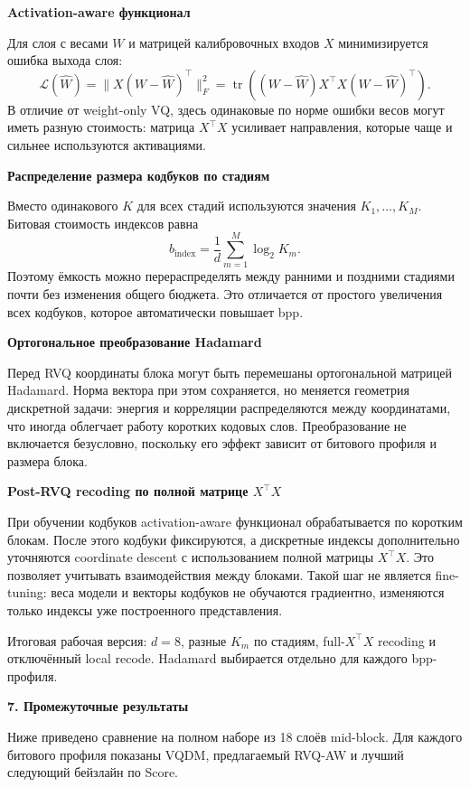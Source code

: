 \documentclass[11pt,a4paper]{article}
\newcommand{\sectiontitle}[1]{%
  \vspace{0.18cm}
  {\large\bfseries\color{msublue} #1}\par\vspace{0.08cm}
}
\newcommand{\subsectiontitle}[1]{%
  \vspace{0.10cm}
  {\normalsize\bfseries\color{msured} #1}\par\vspace{0.04cm}
}
\newcommand{\note}[1]{%
  \begingroup
  \setlength{\fboxsep}{6pt}
  \noindent\colorbox{softblue}{\parbox{\dimexpr\textwidth-2\fboxsep\relax}{#1}}
  \endgroup
}
\begin{document}
\subsectiontitle{Activation-aware функционал}

Для слоя с весами $W$ и матрицей калибровочных входов $X$ минимизируется ошибка выхода слоя:
\[
  \mathcal L(\hat W)=\|X(W-\hat W)^\top\|_F^2
  =\operatorname{tr}\!\left((W-\hat W)X^\top X(W-\hat W)^\top\right).
\]
В отличие от weight-only VQ, здесь одинаковые по норме ошибки весов могут иметь разную стоимость: матрица $X^\top X$ усиливает направления, которые чаще и сильнее используются активациями.

\subsectiontitle{Распределение размера кодбуков по стадиям}

Вместо одинакового $K$ для всех стадий используются значения $K_1,\ldots,K_M$. Битовая стоимость индексов равна
\[
  b_{\mathrm{index}}=\frac{1}{d}\sum_{m=1}^{M}\log_2 K_m.
\]
Поэтому ёмкость можно перераспределять между ранними и поздними стадиями почти без изменения общего бюджета. Это отличается от простого увеличения всех кодбуков, которое автоматически повышает bpp.

\subsectiontitle{Ортогональное преобразование Hadamard}

Перед RVQ координаты блока могут быть перемешаны ортогональной матрицей Hadamard. Норма вектора при этом сохраняется, но меняется геометрия дискретной задачи: энергия и корреляции распределяются между координатами, что иногда облегчает работу коротких кодовых слов. Преобразование не включается безусловно, поскольку его эффект зависит от битового профиля и размера блока.

\subsectiontitle{Post-RVQ recoding по полной матрице $X^\top X$}

При обучении кодбуков activation-aware функционал обрабатывается по коротким блокам. После этого кодбуки фиксируются, а дискретные индексы дополнительно уточняются coordinate descent с использованием полной матрицы $X^\top X$. Это позволяет учитывать взаимодействия между блоками. Такой шаг не является fine-tuning: веса модели и векторы кодбуков не обучаются градиентно, изменяются только индексы уже построенного представления.

\note{Итоговая рабочая версия: $d=8$, разные $K_m$ по стадиям, full-$X^\top X$ recoding и отключённый local recode. Hadamard выбирается отдельно для каждого bpp-профиля.}

\newpage

\sectiontitle{7. Промежуточные результаты}

Ниже приведено сравнение на полном наборе из 18 слоёв mid-block. Для каждого битового профиля показаны VQDM, предлагаемый RVQ-AW и лучший следующий бейзлайн по Score.
\end{document}
